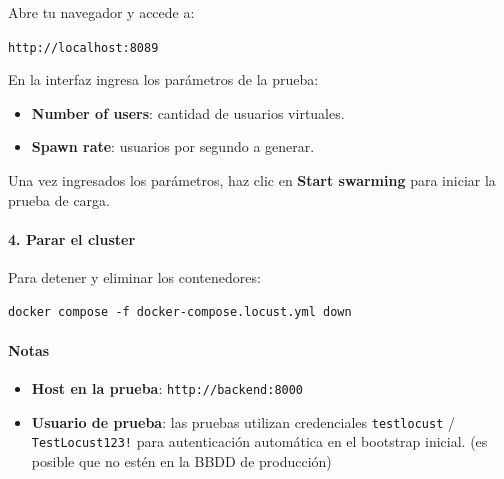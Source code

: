Abre tu navegador y accede a:

\begin{center}
\texttt{http://localhost:8089}
\end{center}

En la interfaz ingresa los parámetros de la prueba:

\begin{itemize}
    \item \textbf{Number of users}: cantidad de usuarios virtuales.
    \item \textbf{Spawn rate}: usuarios por segundo a generar.
\end{itemize}

Una vez ingresados los parámetros, haz clic en \textbf{Start swarming} para iniciar la prueba de carga.

\paragraph*{4. Parar el cluster}

Para detener y eliminar los contenedores:

\begin{verbatim}
docker compose -f docker-compose.locust.yml down
\end{verbatim}

\paragraph*{Notas}

\begin{itemize}
    \item \textbf{Host en la prueba}: \texttt{http://backend:8000}
    \item \textbf{Usuario de prueba}: las pruebas utilizan credenciales \texttt{testlocust} / \texttt{TestLocust123!} para autenticación automática en el bootstrap inicial. (es posible que no estén en la BBDD de producción)
\end{itemize}
